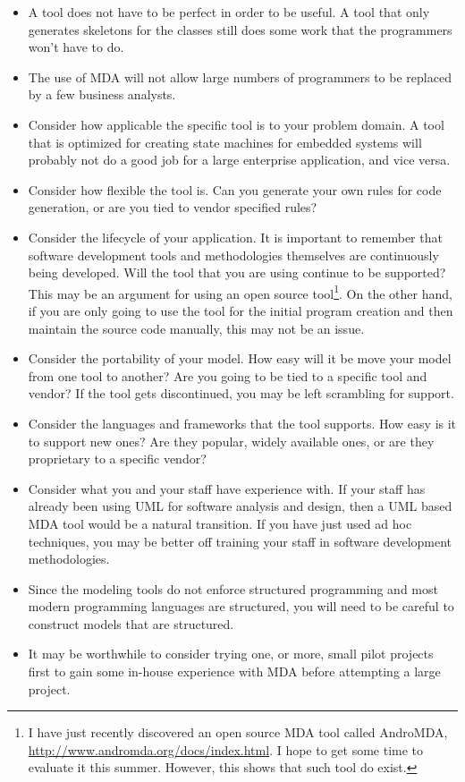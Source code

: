 \documentclass[10pt,journal,letterpaper,compsoc]{IEEEtran}
\begin{document}
\begin{itemize}
  \item A tool does not have to be perfect in order to be useful.  A tool that only generates skeletons for the classes still does some work that the programmers won't have to do.
  \item The use of MDA will not allow large numbers of programmers to be replaced by a few business analysts.
  \item Consider how applicable the specific tool is to your problem domain.  A tool that is optimized for creating state machines for embedded systems will probably not do a good job for a large enterprise application, and vice versa.
  \item Consider how flexible the tool is.  Can you generate your own rules for code generation, or are you tied to vendor specified rules?
  \item Consider the lifecycle of your application.  It is important to remember that software development tools and methodologies themselves are continuously being developed.  Will the tool that you are using continue to be supported?  This may be an argument for using an open source tool\footnote{I have just recently discovered an open source MDA tool called AndroMDA, \url{http://www.andromda.org/docs/index.html}.  I hope to get some time to evaluate it this summer.  However, this shows that such tool do exist.}.  On the other hand, if you are only going to use the tool for the initial program creation and then maintain the source code manually, this may not be an issue.
  \item Consider the portability of your model.  How easy will it be move your model from one tool to another?  Are you going to be tied to a specific tool and vendor?  If the tool gets discontinued, you may be left scrambling for support.
  \item Consider the languages and frameworks that the tool supports.  How easy is it to support new ones?  Are they popular, widely available ones, or are they proprietary to a specific vendor?
  \item Consider what you and your staff have experience with.  If your staff has already been using UML for software analysis and design, then a UML based MDA tool would be a natural transition.  If you have just used ad hoc techniques, you may be better off training your staff in software development methodologies.
  \item Since the modeling tools do not enforce structured programming and most modern programming languages are structured, you will need to be careful to construct models that are structured.
  \item It may be worthwhile to consider trying one, or more, small pilot projects first to gain some in-house experience with MDA before attempting a large project.
\end{itemize}
 
\end{document}
